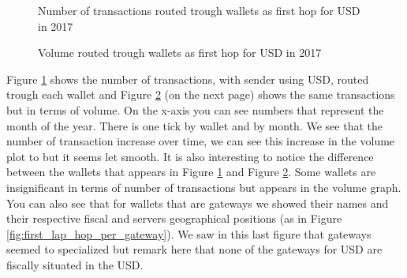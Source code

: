 \begin{figure}[h!]
  \caption{Number of transactions routed trough wallets as first hop for USD in 2017}
  \label{fig:first_hop_USD_nb_txns}
\end{figure}

\begin{figure}[h!]
  \caption{Volume routed trough wallets as first hop for USD in 2017}
  \label{fig:first_hop_USD_volume}
\end{figure}
Figure \ref{fig:first_hop_USD_nb_txns} shows the number of transactions, with sender using USD, routed trough each wallet and Figure \ref{fig:first_hop_USD_volume}  (on the next page) shows the same transactions but in terms of volume. On the x-axis you can see numbers that represent the month of the year. There is one tick by wallet and by month. We see that the number of transaction increase over time, we can see this increase in the volume plot to but it seems let smooth. It is also interesting to notice the difference between the wallets that appears in Figure \ref{fig:first_hop_USD_nb_txns} and Figure \ref{fig:first_hop_USD_volume}. Some wallets are insignificant in terms of number of transactions but appears in the volume graph. You can also see that for wallets that are gateways we showed their names and their respective fiscal and servers geographical positions (as in Figure \ref{fig:first_lap_hop_per_gateway}). We saw in this last figure that gateways seemed to specialized but remark here that none of the gateways for USD are fiscally situated in the USD. 
\vspace{\baselineskip}


